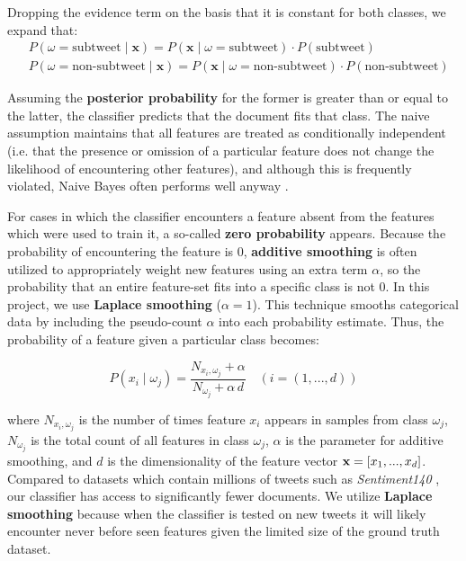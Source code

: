\documentclass[11pt, twoside, reqno]{book}
\begin{document}
\noindent
Dropping the evidence term on the basis that it is constant for both classes, we expand that:
\[
\begin{split}
	&  P(\omega = \text{subtweet} \mid \textbf{x}) = P(\textbf{x} \mid \omega = \text{subtweet}) \cdot P(\text{subtweet}) \\
	&  P(\omega = \text{non-subtweet} \mid \textbf{x}) = P(\textbf{x} \mid \omega = \text{non-subtweet}) \cdot P(\text{non-subtweet})
\end{split}
\]

\noindent
Assuming the \textbf{posterior probability} for the former is greater than or equal to the latter, the classifier predicts that the document fits that class. The naive assumption maintains that all features are treated as conditionally independent (i.e. that the presence or omission of a particular feature does not change the likelihood of encountering other features), and although this is frequently violated, Naive Bayes often performs well anyway \cite{naive_bayes_optimality}.

For cases in which the classifier encounters a feature absent from the features which were used to train it, a so-called \textbf{zero probability} appears. Because the probability of encountering the feature is 0, \textbf{additive smoothing} is often utilized to appropriately weight new features using an extra term $\alpha$, so the probability that an entire feature-set fits into a specific class is not 0. In this project, we use \textbf{Laplace smoothing} ($\alpha=1$). This technique smooths categorical data by including the pseudo-count $\alpha$ into each probability estimate. Thus, the probability of a feature given a particular class becomes:

\[P(x_i \mid \omega_j) = \frac{N_{x_i, \omega_j}+\alpha}{N_{\omega_j} + \alpha \, d}  \quad (i = (1, ... , d))\]

\noindent
where $N_{x_i, \omega_j}$ is the number of times feature $x_i$ appears in samples from class $\omega_j$, $N_{\omega_j}$ is the total count of all features in class $\omega_j$, $\alpha$ is the parameter for additive smoothing, and $d$ is the dimensionality of the feature vector $\textbf x = [x_1, ..., x_d]$. Compared to datasets which contain millions of tweets such as \textit{Sentiment140} \cite{go_dataset}, our classifier has access to significantly fewer documents. We utilize \textbf{Laplace smoothing} because when the classifier is tested on new tweets it will likely encounter never before seen features given the limited size of the ground truth dataset.
\end{document}
